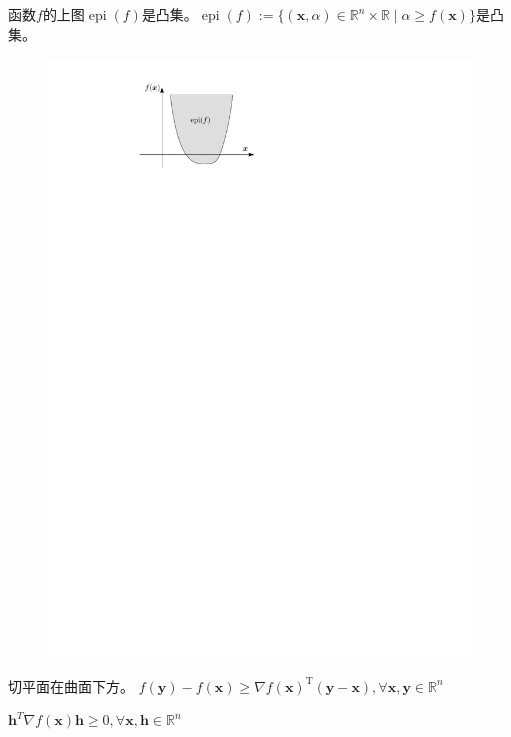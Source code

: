 \begin{definition}[凸函数的等价定义1（上图）]
    函数$f$的上图$\operatorname{epi}(f)$是凸集。$\operatorname{epi}(f):=\{(\boldsymbol{x},\alpha)\in\mathbb{R}^n\times\mathbb{R}\mid\alpha\geqslant f(\boldsymbol{x})\}$是凸集。
    \begin{figure}[H]
        \centering
        \includegraphics{image/epi.pdf}
    \end{figure}
\end{definition}
\begin{definition}
    切平面在曲面下方。
    $f(\boldsymbol{y})-f(\boldsymbol{x})\geqslant\nabla f(\boldsymbol{x})^{\mathrm{T}}(\boldsymbol{y}-\boldsymbol{x}),\forall \boldsymbol{x},\boldsymbol{y}\in\mathbb{R}^{n}$
\end{definition}
\begin{definition}
    $\boldsymbol{h}^{T}\nabla f(\boldsymbol{x})\boldsymbol{h}\geqslant 0,\forall \boldsymbol{x},\boldsymbol{h}\in \mathbb{R}^n$
\end{definition}
